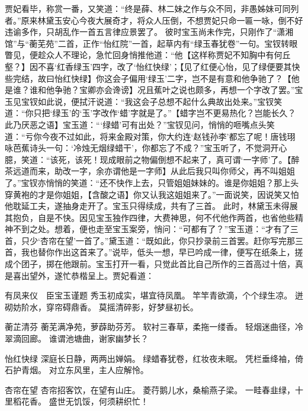 \documentclass[12pt,oneside]{book}
\begin{document}
贾妃看毕，称赏一番，又笑道：“终是薛、林二妹之作与众不同，非愚姊妹可同列者。”原来林黛玉安心今夜大展奇才，将众人压倒，不想贾妃只命一匾一咏，倒不好违谕多作，只胡乱作一首五言律应景罢了。
彼时宝玉尚未作完，只刚作了“潇湘馆”与“蘅芜苑”二首，正作“怡红院”一首，起草内有“绿玉春犹卷”一句。宝钗转眼瞥见，便趁众人不理论，急忙回身悄推他道：“他【这样称贾妃不知胸中有何丘壑？】因不喜‘红香绿玉’四字，改了‘怡红快绿’；【见了红便心怡，见了绿便要其快些完结，故曰怡红快绿】你这会子偏用‘绿玉’二字，岂不是有意和他争驰了？【他是谁？谁和他争驰？宝卿亦会谗谤】况且蕉叶之说也颇多，再想一个字改了罢。”宝玉见宝钗如此说，便拭汗说道：“我这会子总想不起什么典故出处来。”宝钗笑道：“你只把‘绿玉’的‘玉’字改作‘蜡’字就是了。”【蜡字岂不更易热化？岂能长久？此乃厌恶之语】宝玉道：“‘绿蜡’可有出处？”宝钗见问，悄悄的咂嘴点头笑道：“亏你今夜不过如此，将来金殿对策，你大约连‘赵钱孙李’都忘了呢！唐钱珝咏芭蕉诗头一句：‘冷烛无烟绿蜡干’，你都忘了不成？”宝玉听了，不觉洞开心臆，笑道：“该死，该死！现成眼前之物偏倒想不起来了，真可谓‘一字师’了。【醉茶远道而来，助改一字，余亦谓他是一字师】从此后我只叫你师父，再不叫姐姐了。”宝钗亦悄悄的笑道：“还不快作上去，只管姐姐妹妹的。谁是你姐姐？那上头穿黄袍的才是你姐姐，【含酸之语】你又认我这姐姐来了。”一面说笑，因说笑又怕他耽延工夫，遂抽身走开了。宝玉只得续成，共有了三首。
此时，林黛玉未得展其抱负，自是不快。因见宝玉独作四律，大费神思，何不代他作两首，也省他些精神不到之处。想着，便也走至宝玉案旁，悄问：“可都有了？”宝玉道：“才有了三首，只少‘杏帘在望’一首了。”黛玉道：“既如此，你只抄录前三首罢。赶你写完那三首，我也替你作出这首来了。”说毕，低头一想，早已吟成一律，便写在纸条上，搓成个团子，掷在他跟前。宝玉打开一看，只觉此首比自己所作的三首高过十倍，真是喜出望外，遂忙恭楷呈上。贾妃看道：

有凤来仪　臣宝玉谨题
秀玉初成实，堪宜待凤凰。
竿竿青欲滴，个个绿生凉。
迸砌妨阶水，穿帘碍鼎香。
莫摇清碎影，好梦昼初长。

蘅芷清芬
蘅芜满净苑，萝薜助芬芳。
软衬三春草，柔拖一缕香。
轻烟迷曲径，冷翠滴回廊。
谁谓池塘曲，谢家幽梦长？

怡红快绿
深庭长日静，两两出婵娟。
绿蜡春犹卷，红妆夜未眠。
凭栏垂绛袖，倚石护青烟。
对立东风里，主人应解怜。

杏帘在望
杏帘招客饮，在望有山庄。
菱荇鹅儿水，桑榆燕子梁。
一畦春韭绿，十里稻花香。
盛世无饥馁，何须耕织忙！
\end{document}
